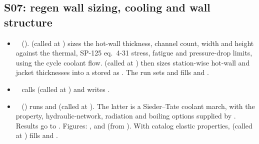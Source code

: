 \subsection{S07: regen wall sizing, cooling and wall structure}\label{sec:df-s07}
\begin{itemize}
  \item {}~ ().  (called at ) sizes the hot-wall thickness, channel count, width and height against the thermal, SP-125 eq.~4-31 stress, fatigue and pressure-drop limits, using the cycle coolant flow.  (called at ) then sizes station-wise hot-wall and jacket thicknesses into a  stored as . The run sets  and fills  and .
  \item {}~ calls  (called at ) and writes .
  \item {}~ () runs  and  (called at ). The latter is a Sieder--Tate coolant march, with the property, hydraulic-network, radiation and boiling options supplied by . Results go to . Figures: ,  and  (from ). With catalog elastic properties,  (called at ) fills  and .
\end{itemize}

